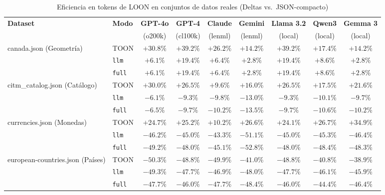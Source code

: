 \begin{table}[t]
  \centering
  \caption{Eficiencia en tokens de LOON en conjuntos de datos reales (Deltas vs.\ JSON-compacto)}
  \label{tab:tokens-real}
  \scriptsize
  \begin{tabular}{@{}llccccccc@{}}
    \toprule
    \textbf{Dataset} & \textbf{Modo} & \textbf{GPT-4o} & \textbf{GPT-4} & \textbf{Claude} & \textbf{Gemini} & \textbf{Llama 3.2} & \textbf{Qwen3} & \textbf{Gemma 3} \\
     & & \scriptsize (o200k) & \scriptsize (cl100k) & \scriptsize (lenml) & \scriptsize (lenml) & \scriptsize (local) & \scriptsize (local) & \scriptsize (local) \\
    \midrule
    \multirow{3}{*}{canada.json (Geometría)} & TOON & $+30.8\%$ & $+39.2\%$ & $+26.2\%$ & $+14.2\%$ & $+39.2\%$ & $+17.4\%$ & $+14.2\%$ \\
     & \texttt{llm} & $+6.1\%$ & $+19.4\%$ & $+6.4\%$ & $+2.8\%$ & $+19.4\%$ & $+8.6\%$ & $+2.8\%$ \\
     & \texttt{full} & $+6.1\%$ & $+19.4\%$ & $+6.4\%$ & $+2.8\%$ & $+19.4\%$ & $+8.6\%$ & $+2.8\%$ \\
    \cline{2-9}
    \multirow{3}{*}{citm\_catalog.json (Catálogo)} & TOON & $+30.0\%$ & $+26.5\%$ & $+9.6\%$ & $+16.0\%$ & $+26.5\%$ & $+17.5\%$ & $+21.6\%$ \\
     & \texttt{llm} & $-6.1\%$ & $-9.3\%$ & $-9.8\%$ & $-13.0\%$ & $-9.3\%$ & $-10.1\%$ & $-9.7\%$ \\
     & \texttt{full} & $-6.5\%$ & $-9.7\%$ & $-10.2\%$ & $-13.5\%$ & $-9.7\%$ & $-10.6\%$ & $-10.2\%$ \\
    \cline{2-9}
    \multirow{3}{*}{currencies.json (Monedas)} & TOON & $+24.7\%$ & $+25.2\%$ & $+10.2\%$ & $+26.6\%$ & $+24.1\%$ & $+26.7\%$ & $+34.9\%$ \\
     & \texttt{llm} & $-46.2\%$ & $-45.0\%$ & $-43.3\%$ & $-51.1\%$ & $-45.0\%$ & $-45.3\%$ & $-46.4\%$ \\
     & \texttt{full} & $-49.2\%$ & $-48.0\%$ & $-45.1\%$ & $-52.8\%$ & $-48.0\%$ & $-48.4\%$ & $-48.3\%$ \\
    \cline{2-9}
    \multirow{3}{*}{european-countries.json (Países)} & TOON & $-50.3\%$ & $-48.8\%$ & $-49.9\%$ & $-41.0\%$ & $-48.8\%$ & $-40.8\%$ & $-38.9\%$ \\
     & \texttt{llm} & $-49.3\%$ & $-47.7\%$ & $-46.9\%$ & $-48.0\%$ & $-47.7\%$ & $-46.1\%$ & $-45.9\%$ \\
     & \texttt{full} & $-47.7\%$ & $-46.0\%$ & $-47.7\%$ & $-48.4\%$ & $-46.0\%$ & $-44.4\%$ & $-46.4\%$ \\

\end{tabular}
\end{table}
